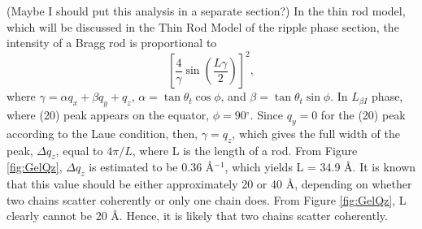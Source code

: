 \documentclass[letterpaper,12pt]{article}
\newcommand{\dg}{$^{\circ}$}%
\newcommand{\iang}{\AA$^{-1}$}%
\begin{document}
(Maybe I should put this analysis in a separate section?) In the thin rod model, which will be discussed in the Thin Rod Model of the ripple phase section, the intensity of a Bragg rod is proportional to 
\begin{equation}
	\left[\frac{4}{\gamma}\sin \left(\frac{L\gamma}{2}\right)\right]^2,
\end{equation}
where $\gamma=\alpha q_x+\beta q_y +q_z$, $\alpha=\tan\theta_t\cos\phi$, and $\beta=\tan\theta_t\sin\phi$. In $L_{\beta I}$ phase, where (20) peak appears on the equator, $\phi=90$\dg. Since $q_y=0$ for the (20) peak according to the Laue condition, then, $\gamma = q_z$, which gives the full width of the peak, $\Delta q_z$, equal to $4\pi/L$, where L is the length of a rod. From Figure \ref{fig:GelQz}, $\Delta q_z$ is estimated to be 0.36 \iang, which yields L = 34.9 \AA. It is known that this value should be either approximately 20 or 40 \AA, depending on whether two chains scatter coherently or only one chain does. From Figure \ref{fig:GelQz}, L clearly cannot be 20 \AA. Hence, it is likely that two chains scatter coherently.

\newpage
\end{document}
